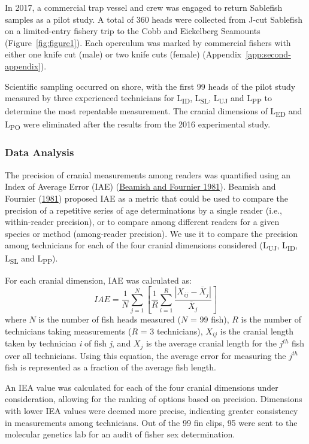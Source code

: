 \documentclass[12pt]{article}\usepackage[]{graphicx}\usepackage[]{color}
\begin{document}
In 2017, a commercial trap vessel and crew was engaged to return Sablefish samples as a pilot study. A total of 360 heads were collected from J-cut Sablefish on a limited-entry fishery trip to the Cobb and Eickelberg Seamounts (Figure~\ref{fig:figure1}). Each operculum was marked by commercial fishers with either one knife cut (male) or two knife cuts (female) (Appendix~\ref{app:second-appendix}).

Scientific sampling occurred on shore, with the first 99 heads of the pilot study measured by three experienced technicians for L\textsubscript{ID}, L\textsubscript{SL}, L\textsubscript{UJ} and L\textsubscript{PP} to determine the most repeatable measurement. The cranial dimensions of L\textsubscript{ED} and L\textsubscript{PO} were eliminated after the results from the 2016 experimental study.

\hypertarget{data-analysis-1}{%
\subsubsection{Data Analysis}\label{data-analysis-1}}

The precision of cranial measurements among readers was quantified using an Index of Average Error (IAE) (\protect\hyperlink{ref-Beamish1981}{Beamish and Fournier 1981}). Beamish and Fournier (\protect\hyperlink{ref-Beamish1981}{1981}) proposed IAE as a metric that could be used to compare the precision of a repetitive series of age determinations by a single reader (i.e., within-reader precision), or to compare among different readers for a given species or method (among-reader precision). We use it to compare the precision among technicians for each of the four cranial dimensions considered (L\textsubscript{UJ}, L\textsubscript{ID}, L\textsubscript{SL} and L\textsubscript{PP}).

For each cranial dimension, IAE was calculated as: \[
IAE=\frac{1}{N}\sum_{j = 1}^{N}\left[\frac{1}{R}\sum_{i = 1}^{R}\frac{|X_{ij} - \overline{X}_j|}{\overline{X}_j}\right]
\] where \(N\) is the number of fish heads measured (\(N\) = 99 fish), \(R\) is the number of technicians taking measurements (\(R\) = 3 technicians), \(X_{ij}\) is the cranial length taken by technician \emph{i} of fish \emph{j}, and \(X_{j}\) is the average cranial length for the \(j^{th}\) fish over all technicians. Using this equation, the average error for measuring the \(j^{th}\) fish is represented as a fraction of the average fish length.

An IEA value was calculated for each of the four cranial dimensions under consideration, allowing for the ranking of options based on precision. Dimensions with lower IEA values were deemed more precise, indicating greater consistency in measurements among technicians. Out of the 99 fin clips, 95 were sent to the molecular genetics lab for an audit of fisher sex determination.
\end{document}
